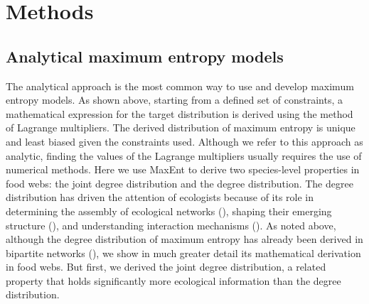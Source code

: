 \section{Methods}

\subsection{Analytical maximum entropy models} 

The analytical approach is the most common way to use and develop maximum
entropy models. As shown above, starting from a defined set of constraints, a
mathematical expression for the target distribution is derived using the method
of Lagrange multipliers. The derived distribution of maximum entropy is unique
and least biased given the constraints used. Although we refer to this approach
as analytic, finding the values of the Lagrange multipliers usually requires the
use of numerical methods. Here we use MaxEnt to derive two species-level
properties in food webs: the joint degree distribution and the degree
distribution. The degree distribution has driven the attention of ecologists
because of its role in determining the assembly of ecological networks
(\cite{Vazquez2005Degree}), shaping their emerging structure
(\cite{Fortuna2010Nestedness}), and understanding interaction mechanisms
(\cite{Williams2011Biology}). As noted above, although the degree distribution
of maximum entropy has already been derived in bipartite networks
(\cite{Williams2011Biology}), we show in much greater detail its mathematical
derivation in food webs. But first, we derived the joint degree distribution, a
related property that holds significantly more ecological information than the
degree distribution. 

